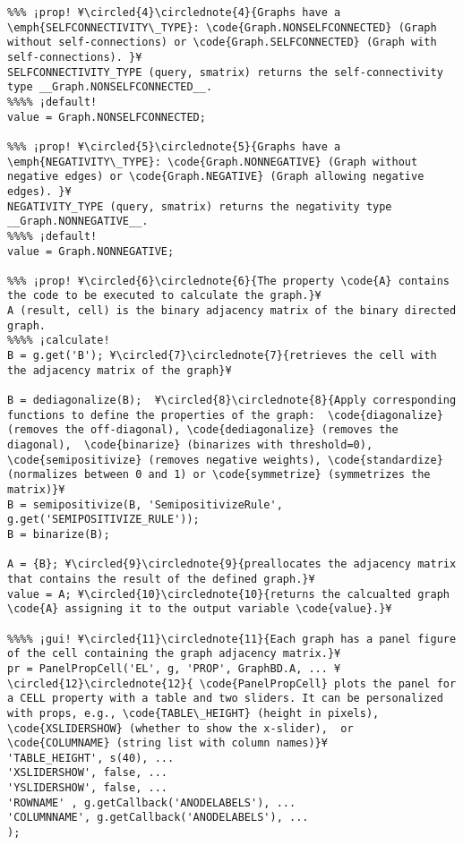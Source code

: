 \documentclass{tufte-handout}
\begin{document}
\begin{lstlisting}
%%% ¡prop! ¥\circled{4}\circlednote{4}{Graphs have a \emph{SELFCONNECTIVITY\_TYPE}: \code{Graph.NONSELFCONNECTED} (Graph without self-connections) or \code{Graph.SELFCONNECTED} (Graph with self-connections). }¥
SELFCONNECTIVITY_TYPE (query, smatrix) returns the self-connectivity type __Graph.NONSELFCONNECTED__.
%%%% ¡default!
value = Graph.NONSELFCONNECTED;

%%% ¡prop! ¥\circled{5}\circlednote{5}{Graphs have a \emph{NEGATIVITY\_TYPE}: \code{Graph.NONNEGATIVE} (Graph without negative edges) or \code{Graph.NEGATIVE} (Graph allowing negative edges). }¥
NEGATIVITY_TYPE (query, smatrix) returns the negativity type __Graph.NONNEGATIVE__.
%%%% ¡default!
value = Graph.NONNEGATIVE;

%%% ¡prop! ¥\circled{6}\circlednote{6}{The property \code{A} contains the code to be executed to calculate the graph.}¥
A (result, cell) is the binary adjacency matrix of the binary directed graph.
%%%% ¡calculate!
B = g.get('B'); ¥\circled{7}\circlednote{7}{retrieves the cell with the adjacency matrix of the graph}¥

B = dediagonalize(B);  ¥\circled{8}\circlednote{8}{Apply corresponding functions to define the properties of the graph:  \code{diagonalize} (removes the off-diagonal), \code{dediagonalize} (removes the diagonal),  \code{binarize} (binarizes with threshold=0), \code{semipositivize} (removes negative weights), \code{standardize} (normalizes between 0 and 1) or \code{symmetrize} (symmetrizes the matrix)}¥
B = semipositivize(B, 'SemipositivizeRule', g.get('SEMIPOSITIVIZE_RULE')); 
B = binarize(B); 

A = {B}; ¥\circled{9}\circlednote{9}{preallocates the adjacency matrix that contains the result of the defined graph.}¥
value = A; ¥\circled{10}\circlednote{10}{returns the calcualted graph \code{A} assigning it to the output variable \code{value}.}¥

%%%% ¡gui! ¥\circled{11}\circlednote{11}{Each graph has a panel figure of the cell containing the graph adjacency matrix.}¥
pr = PanelPropCell('EL', g, 'PROP', GraphBD.A, ... ¥\circled{12}\circlednote{12}{ \code{PanelPropCell} plots the panel for a CELL property with a table and two sliders. It can be personalized with props, e.g., \code{TABLE\_HEIGHT} (height in pixels), \code{XSLIDERSHOW} (whether to show the x-slider),  or \code{COLUMNAME} (string list with column names)}¥
'TABLE_HEIGHT', s(40), ... 
'XSLIDERSHOW', false, ... 
'YSLIDERSHOW', false, ...  
'ROWNAME' , g.getCallback('ANODELABELS'), ... 
'COLUMNNAME', g.getCallback('ANODELABELS'), ...
);









\end{lstlisting}
\end{document}
